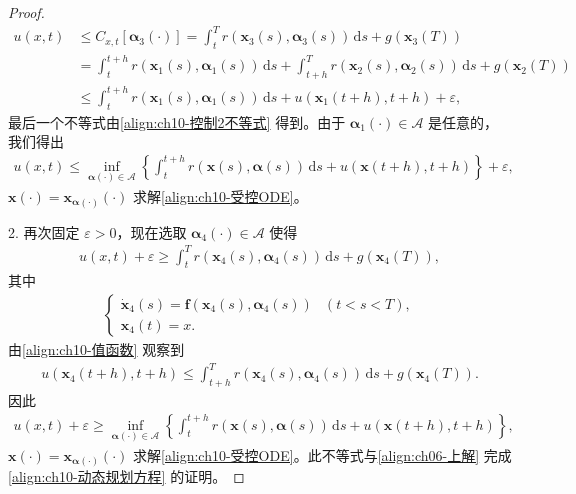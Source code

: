 \documentclass[../../main.tex]{subfiles}
\begin{document}
\begin{proof}
\begin{align*}
u(x,t) &\leqslant C_{x,t}[\boldsymbol{\alpha}_3(\cdot)]=\int_t^T r(\mathbf{x}_3(s),\boldsymbol{\alpha}_3(s))\,\mathrm{d}s+g(\mathbf{x}_3(T))\\
&=\int_t^{t+h}r(\mathbf{x}_1(s),\boldsymbol{\alpha}_1(s))\,\mathrm{d}s+\int_{t+h}^T r(\mathbf{x}_2(s),\boldsymbol{\alpha}_2(s))\,\mathrm{d}s+g(\mathbf{x}_2(T))\\
&\leqslant \int_t^{t+h}r(\mathbf{x}_1(s),\boldsymbol{\alpha}_1(s))\,\mathrm{d}s+u(\mathbf{x}_1(t+h),t+h)+\varepsilon,
\end{align*}
最后一个不等式由\eqref{align:ch10-控制2不等式} 得到。由于 $\boldsymbol{\alpha}_1(\cdot)\in\mathcal{A}$ 是任意的，我们得出
\begin{align}
u(x,t)\leqslant \inf_{\boldsymbol{\alpha}(\cdot)\in\mathcal{A}}\left\{\int_t^{t+h}r(\mathbf{x}(s),\boldsymbol{\alpha}(s))\,\mathrm{d}s+u(\mathbf{x}(t+h),t+h)\right\}+\varepsilon,
\label{align:ch06-上解}
\end{align}
$\mathbf{x}(\cdot)=\mathbf{x}_{\boldsymbol{\alpha}(\cdot)}(\cdot)$ 求解\eqref{align:ch10-受控ODE}。

2. 再次固定 $\varepsilon>0$，现在选取 $\boldsymbol{\alpha}_4(\cdot)\in\mathcal{A}$ 使得
\begin{align}
u(x,t)+\varepsilon\geqslant \int_t^T r(\mathbf{x}_4(s),\boldsymbol{\alpha}_4(s))\,\mathrm{d}s+g(\mathbf{x}_4(T)),
\label{align:ch10-控制4}
\end{align}
其中
\begin{align*}
\begin{cases}
\dot{\mathbf{x}}_4(s)=\mathbf{f}(\mathbf{x}_4(s),\boldsymbol{\alpha}_4(s)) & (t<s<T),\\
\mathbf{x}_4(t)=x.
\end{cases}
\end{align*}
由\eqref{align:ch10-值函数} 观察到
\begin{align}
u(\mathbf{x}_4(t+h),t+h)\leqslant \int_{t+h}^T r(\mathbf{x}_4(s),\boldsymbol{\alpha}_4(s))\,\mathrm{d}s+g(\mathbf{x}_4(T)).
\label{align:ch10-下界辅助}
\end{align}
因此
\begin{align*}
u(x,t)+\varepsilon\geqslant \inf_{\boldsymbol{\alpha}(\cdot)\in\mathcal{A}}\left\{\int_t^{t+h}r(\mathbf{x}(s),\boldsymbol{\alpha}(s))\,\mathrm{d}s+u(\mathbf{x}(t+h),t+h)\right\},
\end{align*}
$\mathbf{x}(\cdot)=\mathbf{x}_{\boldsymbol{\alpha}(\cdot)}(\cdot)$ 求解\eqref{align:ch10-受控ODE}。此不等式与\eqref{align:ch06-上解} 完成\eqref{align:ch10-动态规划方程} 的证明。
\end{proof}
\end{document}
